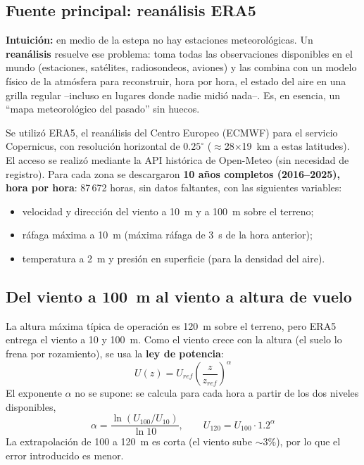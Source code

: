 \documentclass[11pt]{article}
\begin{document}
\subsection{Fuente principal: reanálisis ERA5}

\textbf{Intuición:} en medio de la estepa no hay estaciones meteorológicas.
Un \textbf{reanálisis} resuelve ese problema: toma todas las observaciones
disponibles en el mundo (estaciones, satélites, radiosondeos, aviones) y las
combina con un modelo físico de la atmósfera para reconstruir, hora por
hora, el estado del aire en una grilla regular --incluso en lugares donde
nadie midió nada--. Es, en esencia, un ``mapa meteorológico del pasado'' sin
huecos.

Se utilizó ERA5, el reanálisis del Centro Europeo (ECMWF) para el servicio
Copernicus, con resolución horizontal de $0.25^\circ$ ($\approx$28$\times$19~km
a estas latitudes). El acceso se realizó mediante la API histórica de
Open-Meteo (sin necesidad de registro). Para cada zona se descargaron
\textbf{10 años completos (2016--2025), hora por hora}: 87\,672 horas, sin
datos faltantes, con las siguientes variables:

\begin{itemize}[nosep]
  \item velocidad y dirección del viento a 10~m y a 100~m sobre el terreno;
  \item ráfaga máxima a 10~m (máxima ráfaga de 3~s de la hora anterior);
  \item temperatura a 2~m y presión en superficie (para la densidad del aire).
\end{itemize}

\subsection{Del viento a 100~m al viento a altura de vuelo}

La altura máxima típica de operación es 120~m sobre el terreno, pero ERA5
entrega el viento a 10 y 100~m. Como el viento crece con la altura (el
suelo lo frena por rozamiento), se usa la \textbf{ley de potencia}:
\begin{equation}
U(z) = U_{ref}\left(\frac{z}{z_{ref}}\right)^{\alpha}
\label{eq:potencia}
\end{equation}
El exponente $\alpha$ no se supone: se calcula para cada hora a partir de los
dos niveles disponibles,
\begin{equation}
\alpha = \frac{\ln(U_{100}/U_{10})}{\ln 10},
\qquad
U_{120} = U_{100}\cdot 1.2^{\alpha}
\end{equation}
La extrapolación de 100 a 120~m es corta (el viento sube $\sim$3\%), por lo que
el error introducido es menor.
\end{document}
